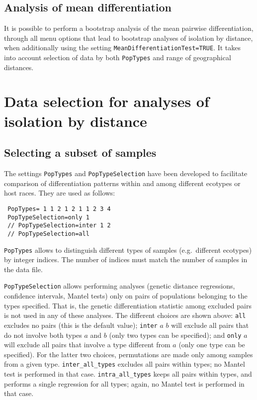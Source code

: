 \documentclass[12pt,]{book}
\begin{document}
\subsection{Analysis of mean
differentiation}\label{analysis-of-mean-differentiation}

 It is possible to perform a
bootstrap analysis of the mean pairwise differentiation, through all
menu options that lead to bootstrap analyses of isolation by distance,
when additionally using the setting
\texttt{MeanDifferentiationTest=TRUE}. It takes into account selection
of data by both \texttt{PopTypes} and range of geographical distances.

\section{Data selection for analyses of isolation by
distance}\label{data-selection-for-analyses-of-isolation-by-distance}

\subsection{Selecting a subset of
samples}\label{selecting-a-subset-of-samples}

  The settings
\texttt{PopTypes} and \texttt{PopTypeSelection} have been developed to
facilitate comparison of differentiation patterns within and among
different ecotypes or host races. They
are used as follows:

\begin{verbatim}
 PopTypes= 1 1 2 1 2 1 1 2 3 4
 PopTypeSelection=only 1
 // PopTypeSelection=inter 1 2
 // PopTypeSelection=all
\end{verbatim}

\texttt{PopTypes} allows to distinguish different types of samples
(e.g.~different ecotypes) by integer indices. The number of indices must
match the number of samples in the data file.

\texttt{PopTypeSelection} allows performing analyses (genetic distance
regressions, confidence intervals, Mantel tests) only on pairs of
populations belonging to the types specified. That is, the genetic
differentiation statistic among excluded pairs is not used in any of
these analyses. The different choices are shown above: \texttt{all}
excludes no pairs (this is the default value); \texttt{inter} \(a\)
\(b\) will exclude all pairs that do not involve both types \(a\) and
\(b\) (only two types can be specified); and \texttt{only} \(a\) will
exclude all pairs that involve a type different from \(a\) (only one
type can be specified). For the latter two choices, permutations are
made only among samples from a given type. \texttt{inter\_all\_types}
excludes all pairs within types; no Mantel test is performed in that
case. \texttt{intra\_all\_types} keeps all pairs within types, and
performs a single regression for all types; again, no Mantel test is
performed in that case.
\end{document}
